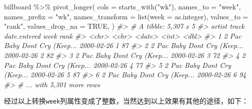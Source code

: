 \documentclass[
]{book}
\newenvironment{Shaded}{\begin{snugshade}}{\end{snugshade}}
\newcommand{\AttributeTok}[1]{\textcolor[rgb]{0.77,0.63,0.00}{#1}}
\newcommand{\CommentTok}[1]{\textcolor[rgb]{0.56,0.35,0.01}{\textit{#1}}}
\newcommand{\ConstantTok}[1]{\textcolor[rgb]{0.00,0.00,0.00}{#1}}
\newcommand{\FunctionTok}[1]{\textcolor[rgb]{0.00,0.00,0.00}{#1}}
\newcommand{\NormalTok}[1]{#1}
\newcommand{\SpecialCharTok}[1]{\textcolor[rgb]{0.00,0.00,0.00}{#1}}
\newcommand{\StringTok}[1]{\textcolor[rgb]{0.31,0.60,0.02}{#1}}
\begin{document}
\begin{Shaded}
\begin{Highlighting}[]
\NormalTok{billboard }\SpecialCharTok{\%\textgreater{}\%} 
  \FunctionTok{pivot\_longer}\NormalTok{(}
    \AttributeTok{cols =} \FunctionTok{starts\_with}\NormalTok{(}\StringTok{"wk"}\NormalTok{), }
    \AttributeTok{names\_to =} \StringTok{"week"}\NormalTok{, }
    \AttributeTok{names\_prefix =} \StringTok{"wk"}\NormalTok{,}
    \AttributeTok{names\_transform =} \FunctionTok{list}\NormalTok{(}\AttributeTok{week =}\NormalTok{ as.integer),}
    \AttributeTok{values\_to =} \StringTok{"rank"}\NormalTok{,}
    \AttributeTok{values\_drop\_na =} \ConstantTok{TRUE}\NormalTok{,}
\NormalTok{  )}
\CommentTok{\#\textgreater{} \# A tibble: 5,307 x 5}
\CommentTok{\#\textgreater{}   artist track                   date.entered  week  rank}
\CommentTok{\#\textgreater{}   \textless{}chr\textgreater{}  \textless{}chr\textgreater{}                   \textless{}date\textgreater{}       \textless{}int\textgreater{} \textless{}dbl\textgreater{}}
\CommentTok{\#\textgreater{} 1 2 Pac  Baby Don\textquotesingle{}t Cry (Keep... 2000{-}02{-}26       1    87}
\CommentTok{\#\textgreater{} 2 2 Pac  Baby Don\textquotesingle{}t Cry (Keep... 2000{-}02{-}26       2    82}
\CommentTok{\#\textgreater{} 3 2 Pac  Baby Don\textquotesingle{}t Cry (Keep... 2000{-}02{-}26       3    72}
\CommentTok{\#\textgreater{} 4 2 Pac  Baby Don\textquotesingle{}t Cry (Keep... 2000{-}02{-}26       4    77}
\CommentTok{\#\textgreater{} 5 2 Pac  Baby Don\textquotesingle{}t Cry (Keep... 2000{-}02{-}26       5    87}
\CommentTok{\#\textgreater{} 6 2 Pac  Baby Don\textquotesingle{}t Cry (Keep... 2000{-}02{-}26       6    94}
\CommentTok{\#\textgreater{} \# ... with 5,301 more rows}
\end{Highlighting}
\end{Shaded}

经过以上转换\texttt{week}列属性变成了整数，当然达到以上效果有其他的途径，如下：
\end{document}
